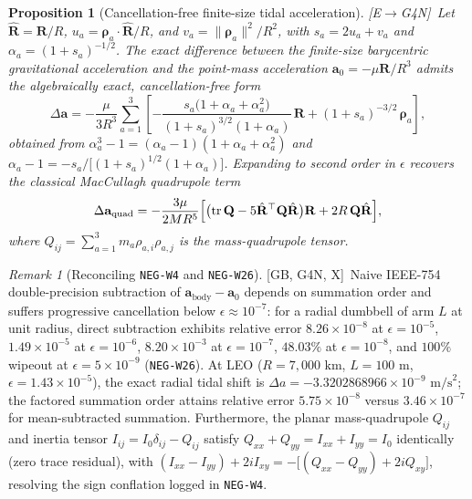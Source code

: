 \documentclass[11pt]{amsart}
\numberwithin{equation}{section}
\theoremstyle{plain}
\newtheorem{proposition}[theorem]{Proposition}
\theoremstyle{definition}\newtheorem{definition}[theorem]{Definition}
\theoremstyle{remark}\newtheorem{remark}[theorem]{Remark}
\newcommand{\ctag}[1]{\textup{\textsf{\scriptsize[#1]}}}
\begin{document}
\begin{proposition}[Cancellation-free finite-size tidal acceleration]\label{prop:cancelfree}
\ctag{E$\to$G4N}\ Let $\hat{\mathbf{R}} = \mathbf{R}/R$, $u_a = \boldsymbol{\rho}_a \cdot \hat{\mathbf{R}} / R$, and $v_a = \|\boldsymbol{\rho}_a\|^2 / R^2$, with $s_a = 2 u_a + v_a$ and $\alpha_a = (1 + s_a)^{-1/2}$. The exact difference between the finite-size barycentric gravitational acceleration and the point-mass acceleration $\mathbf{a}_0 = -\mu \mathbf{R}/R^3$ admits the algebraically exact, cancellation-free form
\begin{equation}\label{eq:exact_da}
\Delta \mathbf{a} = -\frac{\mu}{3 R^3} \sum_{a=1}^{3} \left[
-\frac{s_a\bigl(1 + \alpha_a + \alpha_a^2\bigr)}{(1 + s_a)^{3/2}(1 + \alpha_a)}\,\mathbf{R}
+ (1 + s_a)^{-3/2}\,\boldsymbol{\rho}_a
\right],
\end{equation}
obtained from $\alpha_a^3 - 1 = (\alpha_a - 1)(1 + \alpha_a + \alpha_a^2)$ and $\alpha_a - 1 = -s_a / \bigl[(1+s_a)^{1/2}(1+\alpha_a)\bigr]$. Expanding to second order in $\epsilon$ recovers the classical MacCullagh quadrupole term
\begin{equation}\label{eq:quad_da}
\Delta \mathbf{a}_{\mathrm{quad}} = -\frac{3\mu}{2 M R^5} \Bigl[ \bigl(\operatorname{tr}\mathbf{Q} - 5 \hat{\mathbf{R}}^{\top}\mathbf{Q}\hat{\mathbf{R}}\bigr)\mathbf{R} + 2 R\, \mathbf{Q}\hat{\mathbf{R}} \Bigr],
\end{equation}
where $Q_{ij} = \sum_{a=1}^3 m_a \rho_{a,i} \rho_{a,j}$ is the mass-quadrupole tensor.
\end{proposition}

\begin{remark}[Reconciling \texttt{NEG-W4} and \texttt{NEG-W26}]\label{rem:negw426}
\ctag{GB, G4N, X}\ Naive IEEE-754 double-precision subtraction of $\mathbf{a}_{\mathrm{body}} - \mathbf{a}_0$ depends on summation order and suffers progressive cancellation below $\epsilon \approx 10^{-7}$: for a radial dumbbell of arm $L$ at unit radius, direct subtraction exhibits relative error $8.26\times 10^{-8}$ at $\epsilon = 10^{-5}$, $1.49\times 10^{-5}$ at $\epsilon = 10^{-6}$, $8.20\times 10^{-3}$ at $\epsilon = 10^{-7}$, $48.03\%$ at $\epsilon = 10^{-8}$, and $100\%$ wipeout at $\epsilon = 5\times 10^{-9}$ (\texttt{NEG-W26}). At LEO ($R = 7{,}000\text{ km}$, $L = 100\text{ m}$, $\epsilon = 1.43\times 10^{-5}$), the exact radial tidal shift is $\Delta a = -3.3202868966 \times 10^{-9}\text{ m/s}^2$; the factored summation order attains relative error $5.75\times 10^{-8}$ versus $3.46\times 10^{-7}$ for mean-subtracted summation. Furthermore, the planar mass-quadrupole $Q_{ij}$ and inertia tensor $I_{ij} = I_0 \delta_{ij} - Q_{ij}$ satisfy $Q_{xx} + Q_{yy} = I_{xx} + I_{yy} = I_0$ identically (zero trace residual), with $(I_{xx} - I_{yy}) + 2 i I_{xy} = -\bigl[(Q_{xx} - Q_{yy}) + 2 i Q_{xy}\bigr]$, resolving the sign conflation logged in \texttt{NEG-W4}.
\end{remark}
\end{document}
